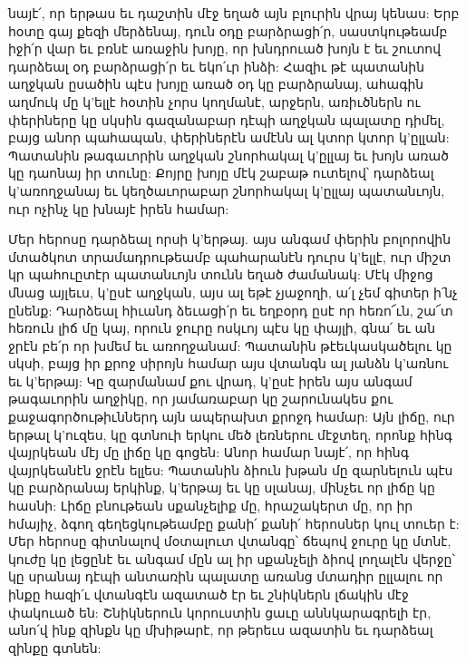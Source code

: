 \documentclass{article}
\begin{document}
{նայէ՛, որ երթաս եւ դաշտին մէջ եղած այն բլուրին վրայ կենաս: Երբ հօտը գայ քեզի մերձենայ, դուն օդը բարձրացի՛ր, սաստկութեամբ իջի՛ր վար եւ բռնէ առաջին խոյը, որ խնդրուած խոյն է եւ շուտով դարձեալ օդ բարձրացի՛ր եւ եկո՛ւր ինձի: Հազիւ թէ պատանին աղջկան ըսածին պէս խոյը առած օդ կը բարձրանայ, ահագին աղմուկ մը կ'ելլէ հօտին չորս կողմանէ, արջերն, առիւծներն ու փերիները կը սկսին գազանաբար դէպի աղջկան պալատը դիմել, բայց անոր պահապան, փերիներէն ամէնն ալ կտոր կտոր կ'ըլլան: Պատանին թագաւորին աղջկան շնորհակալ կ'ըլլայ եւ խոյն առած կը դաոնայ իր տունը: Քոյրը խոյը մէկ շաբաթ ուտելով՝ դարձեալ կ'առողջանայ եւ կեղծաւորաբար շնորհակալ կ'ըլլայ պատանւոյն, ուր ոչինչ կը խնայէ իրեն համար:

Մեր հերոսը դարձեալ որսի կ'երթայ. այս անգամ փերին բոլորովին մտածկոտ տրամադրութեամբ պահարանէն դուրս կ'ելլէ, ուր միշտ կր պահուըտէր պատանւոյն տունն եղած ժամանակ: Մէկ միջոց մնաց այլեւս, կ'ըսէ աղջկան, այս ալ եթէ չյաջողի, ա՛լ չեմ գիտեր ի՛նչ ընենք: Դարձեալ հիւանդ ձեւացի՛ր եւ եղբօրդ ըսէ որ հեռո՜ւն, շա՜տ հեռուն լիճ մը կայ, որուն ջուրը ոսկւոյ պէս կը փայլի, գնա՛ եւ ան ջրէն բե՛ր որ խմեմ եւ առողջանամ: Պատանին թէեւկասկածելու կը սկսի, բայց իր քրոջ սիրոյն համար այս վտանգն ալ յանձն կ'առնու եւ կ'երթայ: Կը զարմանամ քու վրադ, կ'ըսէ իրեն այս անգամ թագաւորին աղջիկը, որ յամառաբար կը շարունակես քու քաջագործութիւններդ այն ապերախտ քրոջդ համար: Այն լիճը, ուր երթալ կ'ուզես, կը գտնուի երկու մեծ լեռներու մէջտեղ, որոնք հինգ վայրկեան մէյ մը լիճը կը գոցեն: Անոր համար նայէ՛, որ հինգ վայրկեանէն ջրէն ելլես: Պատանին ձիուն խթան մը զարնելուն պէս կը բարձրանայ երկինք, կ'երթայ եւ կը սլանայ, մինչեւ որ լիճը կը հասնի: Լիճը բնութեան սքանչելիք մը, հրաշակերտ մը, որ իր հմայիչ, ձգող գեղեցկութեամբը քանի՛ քանի՛ հերոսներ կուլ տուեր է: Մեր հերոսը գիտնալով մօտալուտ վտանգը՝ ճեպով ջուրը կը մտնէ, կուժը կը լեցընէ եւ անգամ մըն ալ իր սքանչելի ձիով լողալէն վերջը՝ կը սրանայ դէպի անտառին պալատը առանց մտադիր ըլլալու որ ինքը հազի՛ւ վտանգէն ազատած էր եւ շնիկներն լճակին մէջ փակուած են: Շնիկներուն կորուստին ցաւը աննկարագրելի էր, անո՛վ ինք զինքն կը մխիթարէ, որ թերեւս ազատին եւ դարձեալ զինքը գտնեն:

}
\end{document}
